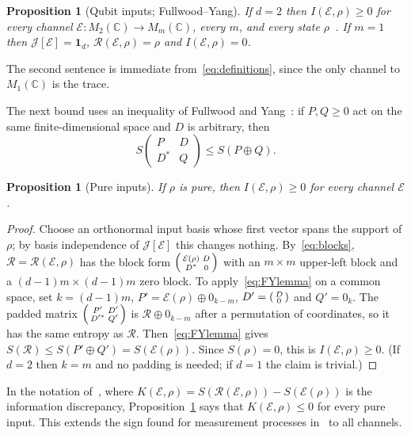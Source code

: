 \documentclass[11pt,a4paper]{article}
\newtheorem{proposition}[theorem]{Proposition}
\theoremstyle{definition}\newtheorem{definition}[theorem]{Definition}
\theoremstyle{remark}\newtheorem{remark}[theorem]{Remark}
\newcommand{\one}{\mathbf{1}}
\newcommand{\E}{\mathcal E}
\newcommand{\R}{\mathcal R}
\newcommand{\J}{\mathcal J}
\begin{document}
\begin{proposition}[Qubit inputs; Fullwood--Yang]\label{prop:FY}
If $d=2$ then $I(\E,\rho)\ge0$ for every channel $\E:M_2(\mathbb C)\to M_m(\mathbb C)$, every $m$, and every state $\rho$~\cite[Theorem~4.1]{FY}. If $m=1$ then $\J[\E]=\one_d$, $\R(\E,\rho)=\rho$ and $I(\E,\rho)=0$.
\end{proposition}
The second sentence is immediate from~\eqref{eq:definitions}, since the only channel to $M_1(\mathbb C)$ is the trace.

The next bound uses an inequality of Fullwood and Yang~\cite[Lemma~4.4(iv)]{FY}: if $P,Q\ge0$ act on the same finite-dimensional space and $D$ is arbitrary, then
\begin{equation}\label{eq:FYlemma}
 S\begin{pmatrix}P&D\\D^*&Q\end{pmatrix}\le S(P\oplus Q).
\end{equation}

\begin{proposition}[Pure inputs]\label{prop:pure}
If $\rho$ is pure, then $I(\E,\rho)\ge0$ for every channel $\E$.
\end{proposition}
\begin{proof}
Choose an orthonormal input basis whose first vector spans the support of $\rho$; by basis independence of $\J[\E]$ this changes nothing. By~\eqref{eq:blocks}, $\R=\R(\E,\rho)$ has the block form $\begin{psmallmatrix}\E(\rho)&D\\D^*&0\end{psmallmatrix}$ with an $m\times m$ upper-left block and a $(d-1)m\times(d-1)m$ zero block. To apply~\eqref{eq:FYlemma} on a common space, set $k=(d-1)m$, $P'=\E(\rho)\oplus0_{k-m}$, $D'=\begin{psmallmatrix}D\\0\end{psmallmatrix}$ and $Q'=0_k$. The padded matrix $\begin{psmallmatrix}P'&D'\\D'^*&Q'\end{psmallmatrix}$ is $\R\oplus0_{k-m}$ after a permutation of coordinates, so it has the same entropy as $\R$. Then~\eqref{eq:FYlemma} gives $S(\R)\le S(P'\oplus Q')=S(\E(\rho))$. Since $S(\rho)=0$, this is $I(\E,\rho)\ge0$. (If $d=2$ then $k=m$ and no padding is needed; if $d=1$ the claim is trivial.)
\end{proof}
In the notation of~\cite{FP}, where $K(\E,\rho)=S(\R(\E,\rho))-S(\E(\rho))$ is the information discrepancy, Proposition~\ref{prop:pure} says that $K(\E,\rho)\le0$ for every pure input. This extends the sign found for measurement processes in~\cite[Theorem~2]{FP} to all channels.
\end{document}
